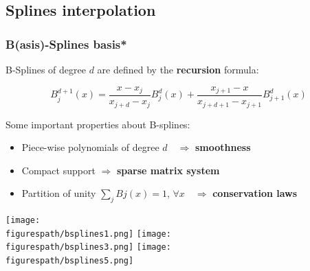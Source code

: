 \documentclass[10pt]{beamer}
\newcommand{\figurespath}{./figures}
\begin{document}
\subsection*{Splines interpolation}
\begin{frame}
	\frametitle{B(asis)-Splines basis*}

	B-Splines of degree $d$ are defined by the \textbf{recursion} formula: 

	\begin{equation}
	B_j^{d+1}(x)= \dfrac{x - x_j}{x_{j+d}-x_j} B_j^d(x)+ \dfrac{x_{j+1} - x}{x_{j+d+1} - x_{j+1}} B_{j+1}^d (x)
	\end{equation}

	Some important properties about B-splines:

	\begin{itemize}
		\item Piece-wise polynomials of degree $d \quad \Rightarrow$ \textbf{smoothness} 
		\item Compact support $\Rightarrow$ \textbf{sparse matrix system}
		\item Partition of unity $\sum_j Bj (x) = 1$, $\forall x \quad \Rightarrow$ \textbf{conservation laws}
	\end{itemize}

	\begin{center}
		\texttt{[image: \\figurespath/bsplines1.png]}
		\texttt{[image: \\figurespath/bsplines3.png]}
		\texttt{[image: \\figurespath/bsplines5.png]}
	\end{center}

\end{frame}
\end{document}
